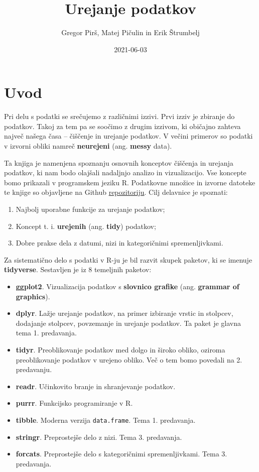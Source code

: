 \documentclass[
]{book}
\title{Urejanje podatkov}
\author{Gregor Pirš, Matej Pičulin in Erik Štrumbelj}
\date{2021-06-03}
\providecommand{\tightlist}{%
  \setlength{\itemsep}{0pt}\setlength{\parskip}{0pt}}
\begin{document}
\maketitle

{
\setcounter{tocdepth}{1}
\tableofcontents
}
\hypertarget{uvod}{%
\chapter*{Uvod}\label{uvod}}

Pri delu s podatki se srečujemo z različnimi izzivi. Prvi izziv je zbiranje do podatkov. Takoj za tem pa se soočimo z drugim izzivom, ki običajno zahteva največ našega časa -- čiščenje in urejanje podatkov. V večini primerov so podatki v izvorni obliki namreč \textbf{neurejeni} (ang. \textbf{messy} data).

Ta knjiga je namenjena spoznanju osnovnih konceptov čiščenja in urejanja podatkov, ki nam bodo olajšali nadaljnjo analizo in vizualizacijo. Vse koncepte bomo prikazali v programskem jeziku R. Podatkovne množice in izvorne datoteke te knjige so objavljene na Github \href{https://github.com/bstatcomp/urejanje-podatkov}{repozitoriju}. Cilj delavnice je spoznati:

\begin{enumerate}
\def\labelenumi{\arabic{enumi})}
\tightlist
\item
  Najbolj uporabne funkcije za urejanje podatkov;
\item
  Koncept t. i. \textbf{urejenih} (ang. \textbf{tidy}) podatkov;
\item
  Dobre prakse dela z datumi, nizi in kategoričnimi spremenljivkami.
\end{enumerate}

Za sistematično delo s podatki v R-ju je bil razvit skupek paketov, ki se imenuje \textbf{tidyverse}. Sestavljen je iz 8 temeljnih paketov:

\begin{itemize}
\tightlist
\item
  \textbf{ggplot2}. Vizualizacija podatkov s \textbf{slovnico grafike} (ang. \textbf{grammar of graphics}).
\item
  \textbf{dplyr}. Lažje urejanje podatkov, na primer izbiranje vrstic in stolpcev, dodajanje stolpcev, povzemanje in urejanje podatkov. Ta paket je glavna tema 1. predavanja.
\item
  \textbf{tidyr}. Preoblikovanje podatkov med dolgo in široko obliko, oziroma preoblikovanje podatkov v urejeno obliko. Več o tem bomo povedali na 2. predavanju.
\item
  \textbf{readr}. Učinkovito branje in shranjevanje podatkov.
\item
  \textbf{purrr}. Funkcijsko programiranje v R.
\item
  \textbf{tibble}. Moderna verzija \texttt{data.frame}. Tema 1. predavanja.
\item
  \textbf{stringr}. Preprostejše delo z nizi. Tema 3. predavanja.
\item
  \textbf{forcats}. Preprostejše delo s kategoričnimi spremenljivkami. Tema 3. predavanja.
\end{itemize}
\end{document}
